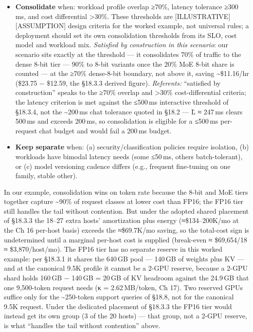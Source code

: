 \begin{itemize}
\tightlist
\item
  \textbf{Consolidate} when: workload profile overlap ≥70\%, latency
  tolerance ≥300\,ms, and cost differential \textgreater30\%. These
  thresholds are \mbox{{[}ILLUSTRATIVE{]}}\hspace{0pt}\mbox{{[}ASSUMPTION{]}} design criteria for
  the worked example, not universal rules; a deployment should set its
  own consolidation thresholds from its SLO, cost model and workload
  mix. \emph{Satisfied by construction in this scenario}: our scenario
  sits exactly at the threshold --- it consolidates 70\% of traffic to
  the dense 8-bit tier --- 90\% to 8-bit variants once the 20\% MoE
  8-bit share is counted --- at the ≥70\% dense-8-bit boundary, not
  above it, saving \textasciitilde\$11.16/hr (\$23.75 − \$12.59, the
  §18.3.3 derived figure). \emph{Referents:} ``satisfied by
  construction'' speaks to the ≥70\% overlap and \textgreater30\%
  cost-differential criteria; the latency criterion is met against the
  ≤500\,ms interactive threshold of §18.3.4, not the
  \textasciitilde200\,ms chat tolerance quoted in §18.2 --- L̄ ≈ 247\,ms
  clears 500\,ms and exceeds 200\,ms, so consolidation is eligible for a
  ≤500\,ms per-request chat budget and would fail a 200\,ms budget.
\item
  \textbf{Keep separate} when: (a) security/classification policies
  require isolation, (b) workloads have bimodal latency needs (some
  ≤50\,ms, others batch-tolerant), or (c) model versioning cadence
  differs (e.g., frequent fine-tuning on one family, stable other).
\end{itemize}

In our example, consolidation wins on token rate because the 8-bit and
MoE tiers together capture \textasciitilde90\% of request classes at
lower cost than FP16; the FP16 tier still handles the tail without
contention. But under the adopted shared placement of §18.3.3 the 18--27
extra hosts' amortization plus energy (≈\$134--200K/mo at the Ch 16
per-host basis) exceeds the ≈\$69.7K/mo saving, so the total-cost sign
is undetermined until a marginal per-host cost is supplied (break-even ≈
\$69,654/18 ≈ \$3,870/host/mo). The FP16 tier has no separate reserve in
this worked example: per §18.3.1 it shares the 640\,GB pool --- 140\,GB
of weights plus KV --- and at the canonical 9.5K profile it cannot be a
2-GPU reserve, because a 2-GPU shard holds 160\,GB − 140\,GB = 20\,GB of
KV headroom against the 24.9\,GB that one 9,500-token request needs (κ =
2.62\,MB/token, Ch 17). Two reserved GPUs suffice only for the
\textasciitilde250-token support queries of §18.8, not for the canonical
9.5K request. Under the dedicated placement of §18.3.3 the FP16 tier
would instead get its own group (3 of the 20 hosts) --- that group, not
a 2-GPU reserve, is what ``handles the tail without contention'' above.

